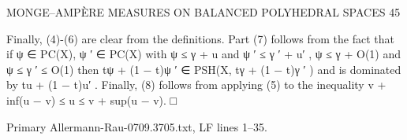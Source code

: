 \documentclass[
  11pt,
]{article}
\newenvironment{Shaded}{}{}
\newcommand{\NormalTok}[1]{#1}
\begin{document}
\begin{Shaded}
\begin{Highlighting}[]
\NormalTok{                   MONGE–AMPÈRE MEASURES ON BALANCED POLYHEDRAL SPACES                                45}


\NormalTok{Finally, (4){-}(6) are clear from the definitions. Part (7) follows from the fact that if ψ ∈ PC(X),}
\NormalTok{ψ ′ ∈ PC(X) with ψ ≤ γ + u and ψ ′ ≤ γ ′ + u′ , ψ ≤ γ + O(1) and ψ ≤ γ ′ ≤ O(1) then}
\NormalTok{                               tψ + (1 − t)ψ ′ ∈ PSH(X, tγ + (1 − t)γ ′ )}
\NormalTok{and is dominated by tu + (1 − t)u′ . Finally, (8) follows from applying (5) to the inequality v +}
\NormalTok{inf(u − v) ≤ u ≤ v + sup(u − v).                                                                □}
\end{Highlighting}
\end{Shaded}

Primary Allermann-Rau-0709.3705.txt, LF lines 1--35.
\end{document}
